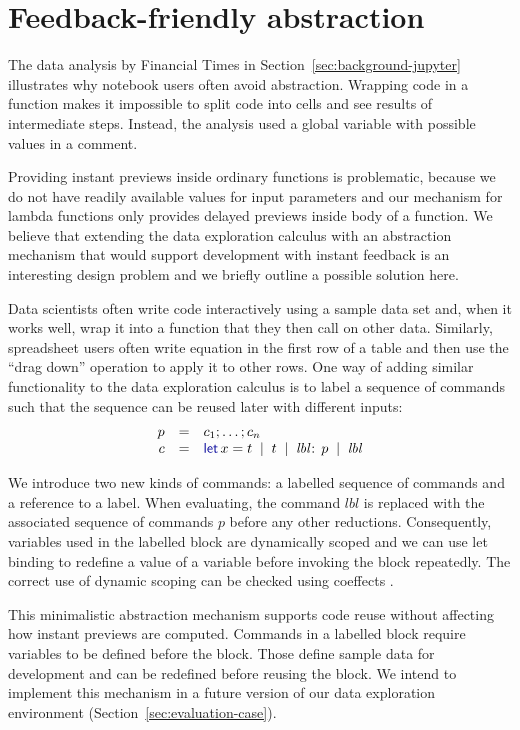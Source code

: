 \documentclass[english,crc]{programming}
\theoremstyle{plain}
\theoremstyle{definition}
\newcommand{\lsep}{\;\;|\;\;}
\newcommand{\kvd}[1]{\textnormal{\textcolor{kvdclr}{\sffamily #1}}}
\begin{document}

\section{Feedback-friendly abstraction}
\label{sec:extra-abstraction}

The data analysis by Financial Times in Section~\ref{sec:background-jupyter} illustrates why
notebook users often avoid abstraction. Wrapping code in a function makes it impossible to
split code into cells and see results of intermediate steps. Instead, the analysis used a
global variable with possible values in a comment.

Providing instant previews inside ordinary functions is problematic, because we do not have readily
available values for input parameters and our mechanism for lambda functions only provides
delayed previews inside body of a function. We believe that extending the data exploration calculus
with an abstraction mechanism that would support development with instant feedback is an
interesting design problem and we briefly outline a possible solution here.

Data scientists often write code interactively using a sample data set and, when it works well,
wrap it into a function that they then call on other data. Similarly, spreadsheet users
often write equation in the first row of a table and then use the ``drag down'' operation to
apply it to other rows. One way of adding similar functionality to the data exploration calculus
is to label a sequence of commands such that the sequence can be reused later with different
inputs:
%
\begin{equation*}
\begin{array}{rcl}
p &=& c_1; \ldots; c_n\\
c &=& \kvd{let}\,x=t \lsep t \lsep \textit{lbl}\!:\,p \lsep \textit{lbl}
\end{array}
\end{equation*}

\noindent
We introduce two new kinds of commands: a labelled sequence of commands and a reference to a label.
When evaluating, the command $\textit{lbl}$ is replaced with the associated sequence of
commands $p$ before any other reductions. Consequently, variables used in the labelled block are
dynamically scoped and we can use let binding to redefine a value of a variable before invoking
the block repeatedly. The correct use of dynamic scoping can be checked using
coeffects \cite{coeffects}.

This minimalistic abstraction mechanism supports code reuse without affecting how instant previews
are computed. Commands in a labelled block require variables to be defined before the block.
Those define sample data for development and can be redefined before reusing the block. We
intend to implement this mechanism in a future version of our data
exploration environment (Section~\ref{sec:evaluation-case}).

\end{document}
